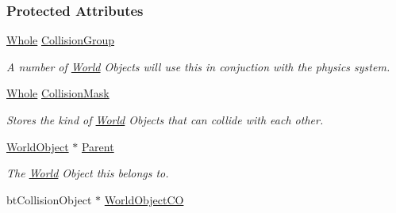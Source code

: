 \subsubsection*{Protected Attributes}
\begin{DoxyCompactItemize}
\item 
\hypertarget{classMezzanine_1_1WorldObjectPhysicsSettings_a5dbea4c96d2eb21cf39e26b138deb4fe}{
\hyperlink{namespaceMezzanine_adcbb6ce6d1eb4379d109e51171e2e493}{Whole} \hyperlink{classMezzanine_1_1WorldObjectPhysicsSettings_a5dbea4c96d2eb21cf39e26b138deb4fe}{CollisionGroup}}
\label{classMezzanine_1_1WorldObjectPhysicsSettings_a5dbea4c96d2eb21cf39e26b138deb4fe}

\begin{DoxyCompactList}\small\item\em A number of \hyperlink{classMezzanine_1_1World}{World} Objects will use this in conjuction with the physics system. \item\end{DoxyCompactList}\item 
\hypertarget{classMezzanine_1_1WorldObjectPhysicsSettings_a9065465b55008f208333b5e39a9bb4c6}{
\hyperlink{namespaceMezzanine_adcbb6ce6d1eb4379d109e51171e2e493}{Whole} \hyperlink{classMezzanine_1_1WorldObjectPhysicsSettings_a9065465b55008f208333b5e39a9bb4c6}{CollisionMask}}
\label{classMezzanine_1_1WorldObjectPhysicsSettings_a9065465b55008f208333b5e39a9bb4c6}

\begin{DoxyCompactList}\small\item\em Stores the kind of \hyperlink{classMezzanine_1_1World}{World} Objects that can collide with each other. \item\end{DoxyCompactList}\item 
\hypertarget{classMezzanine_1_1WorldObjectPhysicsSettings_a0dc3ea3047f6692dcafe4f4ade69aba0}{
\hyperlink{classMezzanine_1_1WorldObject}{WorldObject} $\ast$ \hyperlink{classMezzanine_1_1WorldObjectPhysicsSettings_a0dc3ea3047f6692dcafe4f4ade69aba0}{Parent}}
\label{classMezzanine_1_1WorldObjectPhysicsSettings_a0dc3ea3047f6692dcafe4f4ade69aba0}

\begin{DoxyCompactList}\small\item\em The \hyperlink{classMezzanine_1_1World}{World} Object this belongs to. \item\end{DoxyCompactList}\item 
\hypertarget{classMezzanine_1_1WorldObjectPhysicsSettings_aeb7cc43e0423be4c21aac29dee831209}{
btCollisionObject $\ast$ \hyperlink{classMezzanine_1_1WorldObjectPhysicsSettings_aeb7cc43e0423be4c21aac29dee831209}{WorldObjectCO}}
\label{classMezzanine_1_1WorldObjectPhysicsSettings_aeb7cc43e0423be4c21aac29dee831209}


\end{DoxyCompactItemize}

